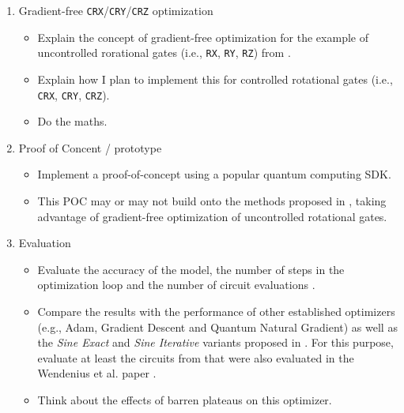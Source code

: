\begin{enumerate}
    \item Gradient-free \texttt{CRX}/\texttt{CRY}/\texttt{CRZ} optimization
    \begin{itemize}
        \item
            Explain the concept of gradient-free optimization for the example of
            uncontrolled rorational gates (i.e., \texttt{RX}, \texttt{RY},
            \texttt{RZ}) from \cite{wendenius_gradient-free_2023}.
        \item
            Explain how I plan to implement this for controlled rotational gates
            (i.e., \texttt{CRX}, \texttt{CRY}, \texttt{CRZ}).
        \item
            Do the maths.
    \end{itemize}

    \item Proof of Concent / prototype
    \begin{itemize}
        \item
            Implement a proof-of-concept using a popular quantum computing SDK.
        \item
            This POC may or may not build onto the methods proposed in
            \cite{wendenius_gradient-free_2023}, taking advantage of
            gradient-free optimization of uncontrolled rotational gates.
    \end{itemize}

    \item Evaluation
    \begin{itemize}
        \item
            Evaluate the accuracy of the model, the number of steps in the
            optimization loop and the number of circuit evaluations
            \cite{wendenius_gradient-free_2023}.
        \item
            Compare the results with the performance of other established
            optimizers (e.g., Adam, Gradient Descent and
            Quantum Natural Gradient) as well as the \emph{Sine Exact} and
            \emph{Sine Iterative} variants proposed in
            \cite{wendenius_gradient-free_2023}.
            For this purpose, evaluate at least the circuits from
            \cite{sim_expressibility_2019} that were also evaluated in the
            Wendenius et al. paper \cite{wendenius_gradient-free_2023}.
        \item
            Think about the effects of barren plateaus on this optimizer.
    \end{itemize}


\end{enumerate}
